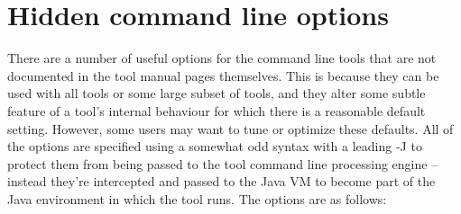 \section{Hidden command line options}

There are a number of useful options for the command line tools that
are not documented in the tool manual pages themselves.  This is because
they can be used with all tools or some large subset of tools, and they
alter some subtle feature of a tool's internal behaviour for which there
is a reasonable default setting.  However, some users may want to tune
or optimize these defaults.  All of the options are specified using a somewhat odd
syntax with a leading {\file -J} to protect them from being passed to the tool
command line processing engine -- instead they're intercepted and passed to
the Java VM to become part of the Java environment in which the tool runs.  The
options are as follows:
